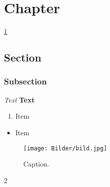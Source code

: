 \chapter{Chapter}
\label{chapter}
\ref{chapter}

\section{Section}
\subsection{Subsection}

\emph{Text}
\textbf{Text}
\cite{cite}

\begin{enumerate}
  \item Item
\end{enumerate}

\begin{itemize}
  \item Item
\end{itemize}

\begin{figure}[h!]
  \centering
  \texttt{[image: Bilder/bild.jpg]}
  \caption{Caption. \protect\cite{cite}}
\end{figure}

\newpage

\vspace{1cm}
2\baselineskip